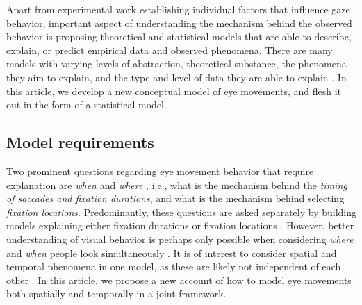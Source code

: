 \documentclass{article}
\begin{document}
Apart from experimental work establishing individual factors that influence gaze behavior, important aspect of understanding the mechanism behind the observed behavior is proposing theoretical and statistical models that are able to describe, explain, or predict empirical data and observed phenomena. There are many models with varying levels of abstraction, theoretical substance, the phenomena they aim to explain, and the type and level of data they are able to explain \citep{tatler2017latest,trukenbrod2014icat,nuthmann2017fixation_durations,zelinsky2013modelling,schutt2017likelihood,schwetlick2020scenewalk_extendeds,le_meur2015saccadic,malem2020exploration,reichle2015ez}. In this article, we develop a new conceptual model of eye movements, and flesh it out in the form of a statistical model.

\subsection{Model requirements}

Two prominent questions regarding eye movement behavior that require explanation are \textit{when} and \textit{where} \citep{findlay1999model,tatler2017latest}, i.e., what is the mechanism behind the \textit{timing of saccades and fixation durations}, and what is the mechanism behind selecting \textit{fixation locations}. Predominantly, these questions are asked separately by building models explaining either fixation durations or fixation locations \citep{tatler2017latest,schutt2017likelihood,nuthmann2010crisp}. However, better understanding of visual behavior is perhaps only possible when considering  \textit{where} and \textit{when} people look simultaneously \citep{tatler2017latest}. It is of interest to consider spatial and temporal phenomena in one model, as these are likely not independent of each other \citep[e.g., ][]{henderson2013duration,nuthmann2017fixation_durations}. In this article, we propose a new account of how to model eye movements both spatially and temporally in a joint framework.
\end{document}
